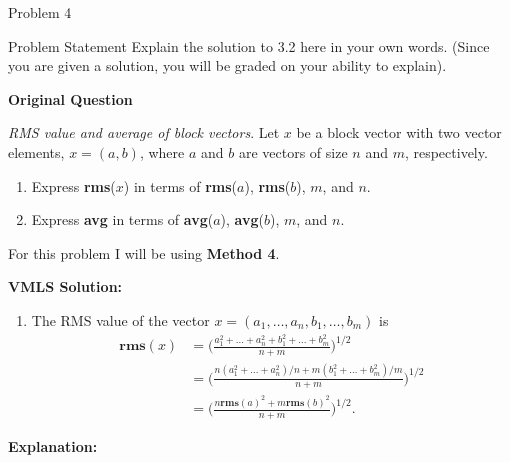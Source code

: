 \begin{problem}{Problem 4}
    \begin{statement}{Problem Statement}
        Explain the solution to 3.2 here in your own words. (Since you are given a solution, you will be graded on your ability to explain). \vspace*{1em}

        \textbf{Original Question} \vspace*{1em}

        \textit{RMS value and average of block vectors}. Let $x$ be a block vector with two vector elements, $x = (a,b)$, where $a$ and $b$ are vectors of size $n$ and $m$, respectively.

        \begin{enumerate}[label=(\alph*)]
            \item Express \textbf{rms}($x$) in terms of \textbf{rms}($a$), \textbf{rms}($b$), $m$, and $n$.
            \item Express \textbf{avg} in terms of \textbf{avg}($a$), \textbf{avg}($b$), $m$, and $n$.
        \end{enumerate}
    \end{statement}

    \begin{highlight}
        For this problem I will be using \textbf{Method 4}. \vspace*{1em}

        \textbf{VMLS Solution:}

        \begin{enumerate}[label=(\alph*)]
            \item The RMS value of the vector $x = (a_{1}, \dots, a_{n}, b_{1}, \dots, b_{m})$ is 
            \begin{align*}
                \mathbf{rms}(x) & = \Bigg(\frac{a^{2}_{1} + \dots + a^{2}_{n} + b^{2}_{1} + \dots + b^{2}_{m}}{n + m}\Bigg)^{1/2} \\
                & = \Bigg(\frac{n(a^{2}_{1} + \dots + a^{2}_{n})/n + m(b^{2}_{1} + \dots + b^{2}_{m})/m}{n+m} \Bigg)^{1/2} \\
                & = \Bigg(\frac{n\mathbf{rms}(a)^{2} + m\mathbf{rms}(b)^{2}}{n+m} \Bigg)^{1/2}.
            \end{align*}
        \end{enumerate}

        \textbf{Explanation:} \vspace*{1em}


\end{highlight}
\end{problem}
